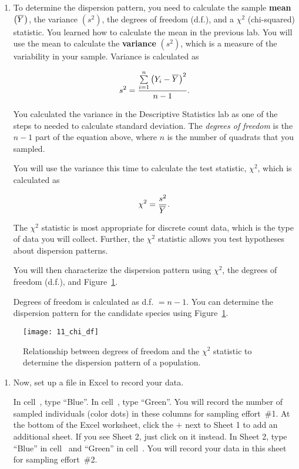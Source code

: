 \documentclass[12pt, hidelinks]{exam}
\newcommand\chisq{$\chi^2$}
\newcommand*\meanY{\overline{Y}\kern0.67pt}
\newcommand*\xcell[1]{cell~\liningnum{#1}}
\begin{document}
\begin{enumerate}

\item To determine the dispersion pattern, you need to calculate the sample
\textbf{mean} $\left( \meanY\right)$, the variance $(s^2)$, the degrees of freedom (d.f.), 
and a \chisq{} (chi-squared) statistic. You learned how to calculate the mean in the previous lab. You will use
the mean to calculate the \textbf{variance} $(s^2)$, which is a measure of the variability in your sample. Variance is calculated as 

\[s^2 =  \frac{\sum\limits_{i=1}^n \left( Y_i - \meanY \right)^2}{n-1}. \]

You calculated the variance in the Descriptive Statistics lab as one of the steps to needed to calculate standard deviation. The \emph{degrees of freedom} is the $n-1$ part of the equation above, where $n$ is the number of quadrats that you sampled.

You will use the variance this time to calculate the test statistic, \chisq{}, which is calculated
as

\[ \chi^2 = \dfrac{s^2}{\meanY}. \] %

The \chisq{} statistic is most appropriate for discrete count data, which is the type of data you will collect. Further, the \chisq{} statistic allows you test hypotheses about dispersion patterns. 

You will then characterize the dispersion pattern using
\chisq{}, the degrees of freedom (d.f.), and Figure~\ref{fig:chi_df}.

Degrees of freedom is calculated as d.f. $= n-1.$  You can determine the dispersion pattern for the candidate species using Figure~\ref{fig:chi_df}.  

\end{enumerate}

\begin{figure}[h!]
	\begin{center}
	\captionsetup{width=0.78\textwidth}
	\texttt{[image: 11\_chi\_df]}
	\caption{Relationship between degrees of freedom and the \chisq{}
statistic to determine the dispersion pattern of a
population.}\label{fig:chi_df}
	\end{center}
\end{figure}

\begin{enumerate}[resume]

\item Now, set up a file in Excel to record your data.

In \xcell{A1}, type “Blue”. In \xcell{D1}, type “Green”. You will record the number of sampled individuals (color dots) in these columns for sampling effort~\#1. At the bottom of the Excel worksheet, click the $+$ next to Sheet 1 to add an additional sheet. If you see Sheet 2, just click on it instead. In Sheet 2,
type “Blue” in \xcell{A1} and “Green” in \xcell{D1}. You will record your data
in this sheet for sampling effort~\#2.

\end{enumerate}
\end{document}
